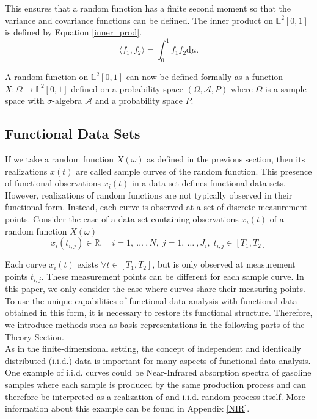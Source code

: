 \documentclass[11pt,twoside,a4paper]{article}
\begin{document}
	This ensures that a random function has a finite second moment so that the variance and covariance functions can be defined. The inner product on $\mathbb{L}^2[0,1]$ is defined by Equation \ref{inner_prod}.
	\begin{equation}\label{inner_prod}
		\langle f_1, f_2 \rangle = \int_{0}^{1} f_1 f_2 \mathrm{d}\mu.
	\end{equation}
	
	A random function on $\mathbb{L}^2[0,1]$ can now be defined formally as a function $X : \Omega \rightarrow \mathbb{L}^2[0,1]$ defined on a probability space $(\Omega, \mathcal{A}, P)$ where $\Omega$ is a sample space with $\sigma$-algebra $\mathcal{A}$ and a probability space $P$.
	
	\subsection{Functional Data Sets}
	If we take a random function $X(\omega)$ as defined in the previous section, then its realizations $x(t)$ are called sample curves of the random function. This presence of functional observations $x_i(t)$ in a data set defines functional data sets. However,  realizations of random functions are not typically observed in their functional form. Instead, each curve is observed at a set of discrete measurement points. Consider the case of a data set containing observations $x_i(t)$ of a random function $X(\omega)$
	\begin{equation}
		x_{i}(t_{i,j}) \in \mathbb{R}, \quad i = 1,\: \dots\: ,N, \; j = 1, \: \dots \:, J_i, \; t_{i,j} \in [T_1, T_2]
	\end{equation}
	
	Each curve $x_i(t)$ exists $\forall t \in [T_1, T_2]$, but is only observed at measurement points $t_{i,j}$. These measurement points can be different for each sample curve. In this paper, we only consider the case where curves share their measuring points.
	To use the unique capabilities of functional data analysis with functional data obtained in this form, it is necessary to restore its functional structure. Therefore, we introduce methods such as basis representations in the following parts of the Theory Section.\\
	As in the finite-dimensional setting, the concept of independent and identically distributed (i.i.d.) data is important for many aspects of functional data analysis. One example of i.i.d. curves could be Near-Infrared absorption spectra of gasoline samples where each sample is produced by the same production process and can therefore be interpreted as a realization of and i.i.d. random process itself. More information about this example can be found in Appendix \ref{NIR}.
	
\end{document}
